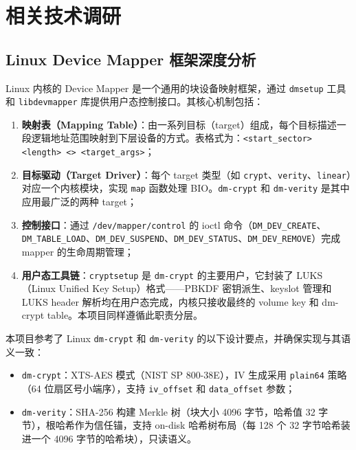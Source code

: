 \section{相关技术调研}

\subsection{Linux Device Mapper 框架深度分析}

Linux 内核的 Device Mapper 是一个通用的块设备映射框架，通过 \texttt{dmsetup} 工具和 \texttt{libdevmapper} 库提供用户态控制接口。其核心机制包括：

\begin{enumerate}
    \item \textbf{映射表（Mapping Table）}：由一系列目标（target）组成，每个目标描述一段逻辑地址范围映射到下层设备的方式。表格式为：\texttt{<start\_sector> <length> <> <target\_args>}；
    \item \textbf{目标驱动（Target Driver）}：每个 target 类型（如 \texttt{crypt}、\texttt{verity}、\texttt{linear}）对应一个内核模块，实现 \texttt{map} 函数处理 BIO。\texttt{dm-crypt} 和 \texttt{dm-verity} 是其中应用最广泛的两种 target；
    \item \textbf{控制接口}：通过 \texttt{/dev/mapper/control} 的 ioctl 命令（\texttt{DM\_DEV\_CREATE}、\texttt{DM\_TABLE\_LOAD}、\texttt{DM\_DEV\_SUSPEND}、\texttt{DM\_DEV\_STATUS}、\texttt{DM\_DEV\_REMOVE}）完成 mapper 的生命周期管理；
    \item \textbf{用户态工具链}：\texttt{cryptsetup} 是 \texttt{dm-crypt} 的主要用户，它封装了 LUKS（Linux Unified Key Setup）格式——PBKDF 密钥派生、keyslot 管理和 LUKS header 解析均在用户态完成，内核只接收最终的 volume key 和 dm-crypt table。本项目同样遵循此职责分层。
\end{enumerate}

本项目参考了 Linux \texttt{dm-crypt} 和 \texttt{dm-verity} 的以下设计要点，并确保实现与其语义一致：

\begin{itemize}
    \item \texttt{dm-crypt}：XTS-AES 模式（NIST SP 800-38E），IV 生成采用 \texttt{plain64} 策略（64 位扇区号小端序），支持 \texttt{iv\_offset} 和 \texttt{data\_offset} 参数；
    \item \texttt{dm-verity}：SHA-256 构建 Merkle 树（块大小 4096 字节，哈希值 32 字节），根哈希作为信任锚，支持 on-disk 哈希树布局（每 128 个 32 字节哈希装进一个 4096 字节的哈希块），只读语义。
\end{itemize}

